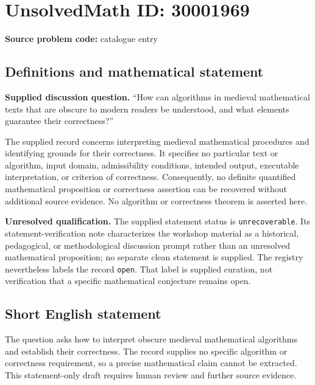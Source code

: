 \documentclass[11pt]{article}
\begin{document}
\section*{UnsolvedMath ID: 30001969}
\textbf{Source problem code:} catalogue entry
\subsection{Definitions and mathematical statement}
\textbf{Supplied discussion question.} ``How can algorithms in medieval mathematical texts that are obscure to modern readers be understood, and what elements guarantee their correctness?''

The supplied record concerns interpreting medieval mathematical procedures and identifying grounds for their correctness. It specifies no particular text or algorithm, input domain, admissibility conditions, intended output, executable interpretation, or criterion of correctness. Consequently, no definite quantified mathematical proposition or correctness assertion can be recovered without additional source evidence. No algorithm or correctness theorem is asserted here.

\textbf{Unresolved qualification.} The supplied statement status is \texttt{unrecoverable}. Its statement-verification note characterizes the workshop material as a historical, pedagogical, or methodological discussion prompt rather than an unresolved mathematical proposition; no separate clean statement is supplied. The registry nevertheless labels the record \texttt{open}. That label is supplied curation, not verification that a specific mathematical conjecture remains open.
\subsection{Short English statement}
The question asks how to interpret obscure medieval mathematical algorithms and establish their correctness. The record supplies no specific algorithm or correctness requirement, so a precise mathematical claim cannot be extracted. This statement-only draft requires human review and further source evidence.
\end{document}
